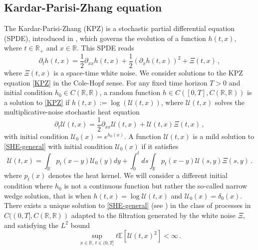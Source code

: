 \documentclass[a4paper,11pt,oneside,reqno]{amsart}
\theoremstyle{definition}
\newcommand{\R}{\ensuremath{\mathbb{R}}}
\numberwithin{equation}{section}
\begin{document}
\subsection{Kardar-Parisi-Zhang equation}\label{Section-mainResult}
The Kardar-Parisi-Zhang (KPZ) is a stochastic partial differential equation (SPDE), introduced in \cite{KPZ-original}, which governs the evolution of a function $h(t,x)$, where $t\in \mathbb{R}_{+}$ and $x\in \mathbb{R}$. This SPDE reads
\begin{equation}
    \partial_{t} h(t,x)=\frac{1}{2}\partial_{xx}h(t,x)+\frac{1}{2}\left(\partial_{x}h(t,x)\right)^{2}+\Xi(t,x)\,, 
    \label{KPZ}
    \tag{KPZ}
\end{equation}
where $\Xi(t,x)$ is a space-time white noise. We consider solutions to the KPZ equation \eqref{KPZ} in the Cole-Hopf sense. For any fixed time horizon $T>0$ and initial condition $h_0\in C(\R,\R)$, a random function $h\in C([0,T], C(\R,\R))$ is a solution to \eqref{KPZ} if  $h(t,x):=\log(\mathcal{U}(t,x))$, where $\mathcal{U}(t,x)$ solves the multiplicative-noise stochastic heat equation
\begin{equation}\label{SHE-general}\tag{mSHE}
    \partial_{t}\mathcal{U}(t,x)=\frac{1}{2}\partial_{xx}\mathcal{U}(t,x)+\mathcal{U}(t,x)\Xi(t,x)\,,
\end{equation}
with initial condition $\mathcal{U}_{0}(x)=e^{h_{0}(x)}$. A function $\mathcal{U}(t,x)$ is a {\color{black}mild} solution to \eqref{SHE-general} with initial condition $\mathcal{U}_{0}(x)$ if it satisfies 
\begin{equation*}
    \mathcal{U}(t,x)=\int_{\mathbb{R}}p_{t}(x-y)\mathcal{U}_{0}(y)dy+\int_{0}^{t}ds\int_{\mathbb{R}}p_{t}(x-y)\mathcal U(s,y)\Xi(s,y)\,.
\end{equation*}
where $p_{t}(x)$ denotes the heat kernel. We will consider a {\color{black} different initial condition} where $h_0$ is not a continuous function but rather the so-called narrow wedge solution, that is when $h(t,x) = \log \mathcal U(t,x)$ and  $\mathcal{U}_{0}(x)=\delta_{0}(x)$. There exists a unique solution to \eqref{SHE-general} (see \cite{bertini1995stochastic, parekh2019-BD}) in the class of processes in $C((0,T], C(\R,\R))$ adapted to the filtration generated by the white noise $\Xi$, and satisfying the $L^2$ bound 
\begin{equation*}
    \sup_{x\in \mathbb{R},\, t\in(0,T]}t\mathbb{E}\left[\mathcal{U}(t,x)^{2}\right]<\infty\,.
\end{equation*}
\end{document}
